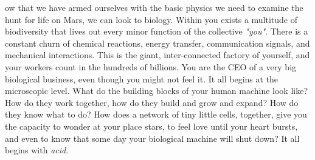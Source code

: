 ow that we have armed ourselves with the basic physics we need to examine the hunt for life on Mars, we can look to biology. 
Within you exists a multitude of biodiversity that lives out every minor function of the collective \emph{"you"}.
There is a constant churn of chemical reactions, energy transfer, communication signals, and mechanical interactions.
This is the giant, inter-connected factory of yourself, and your workers count in the hundreds of billions. 
You are the CEO of a very big biological business, even though you might not feel it.
It all begins at the microscopic level. 
What do the building blocks of your human machine look like?
How do they work together, how do they build and grow and expand?
How do they know what to do?
How does a network of tiny little cells, together, give you the capacity to wonder at your place stars, to feel love until your heart bursts, and even to know that some day your biological machine will shut down?
It all begins with \emph{acid}. 
